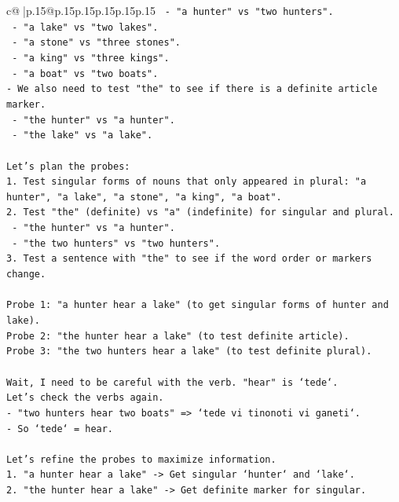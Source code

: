 \documentclass{article}
\begin{document}
{\begin{supertabular}{c@{$\;$}|p{.15\linewidth}@{}p{.15\linewidth}p{.15\linewidth}p{.15\linewidth}p{.15\linewidth}p{.15\linewidth}}
{{{\texttt{  {-} "a hunter" vs "two hunters".} \\
\texttt{  {-} "a lake" vs "two lakes".} \\
\texttt{  {-} "a stone" vs "three stones".} \\
\texttt{  {-} "a king" vs "three kings".} \\
\texttt{  {-} "a boat" vs "two boats".} \\
\texttt{{-} We also need to test "the" to see if there is a definite article marker.} \\
\texttt{  {-} "the hunter" vs "a hunter".} \\
\texttt{  {-} "the lake" vs "a lake".} \\
\\ 
\texttt{Let's plan the probes:} \\
\texttt{1. Test singular forms of nouns that only appeared in plural: "a hunter", "a lake", "a stone", "a king", "a boat".} \\
\texttt{2. Test "the" (definite) vs "a" (indefinite) for singular and plural.} \\
\texttt{   {-} "the hunter" vs "a hunter".} \\
\texttt{   {-} "the two hunters" vs "two hunters".} \\
\texttt{3. Test a sentence with "the" to see if the word order or markers change.} \\
\\ 
\texttt{Probe 1: "a hunter hear a lake" (to get singular forms of hunter and lake).} \\
\texttt{Probe 2: "the hunter hear a lake" (to test definite article).} \\
\texttt{Probe 3: "the two hunters hear a lake" (to test definite plural).} \\
\\ 
\texttt{Wait, I need to be careful with the verb. "hear" is `tede`.} \\
\texttt{Let's check the verbs again.} \\
\texttt{{-} "two hunters hear two boats" => `tede vi tinonoti vi ganeti`.} \\
\texttt{{-} So `tede` = hear.} \\
\\ 
\texttt{Let's refine the probes to maximize information.} \\
\texttt{1. "a hunter hear a lake" {-}> Get singular `hunter` and `lake`.} \\
\texttt{2. "the hunter hear a lake" {-}> Get definite marker for singular.} \\
}}}
\end{supertabular}}
\end{document}
